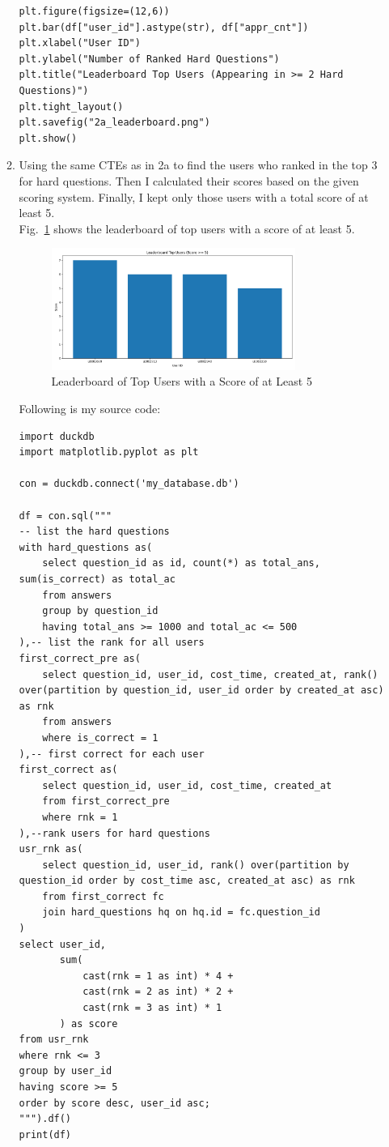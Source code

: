 \documentclass[12pt,a4paper]{article}
\begin{document}
\begin{enumerate}
\begin{enumerate}
\begin{verbatim}
plt.figure(figsize=(12,6))
plt.bar(df["user_id"].astype(str), df["appr_cnt"])
plt.xlabel("User ID")
plt.ylabel("Number of Ranked Hard Questions")
plt.title("Leaderboard Top Users (Appearing in >= 2 Hard Questions)")
plt.tight_layout()
plt.savefig("2a_leaderboard.png")
plt.show()            
        \end{verbatim}
        \item Using the same CTEs as in 2a to find the users who ranked in the top 3 for hard questions. Then I calculated their scores based on the given scoring system. Finally, I kept only those users with a total score of at least 5.\\
        Fig.~\ref{fig:2b} shows the leaderboard of top users with a score of at least 5.
        \begin{figure}[H]
            \centering
            \includegraphics[width=0.8\textwidth]{code/2b_leaderboard.png}
            \caption{Leaderboard of Top Users with a Score of at Least 5}
            \label{fig:2b}
        \end{figure}
        Following is my source code:
        \begin{verbatim}
import duckdb
import matplotlib.pyplot as plt

con = duckdb.connect('my_database.db')

df = con.sql("""
-- list the hard questions
with hard_questions as(
    select question_id as id, count(*) as total_ans, sum(is_correct) as total_ac
    from answers
    group by question_id
    having total_ans >= 1000 and total_ac <= 500
),-- list the rank for all users
first_correct_pre as(
    select question_id, user_id, cost_time, created_at, rank() over(partition by question_id, user_id order by created_at asc) as rnk
    from answers
    where is_correct = 1
),-- first correct for each user
first_correct as(
    select question_id, user_id, cost_time, created_at
    from first_correct_pre
    where rnk = 1
),--rank users for hard questions
usr_rnk as(
    select question_id, user_id, rank() over(partition by question_id order by cost_time asc, created_at asc) as rnk
    from first_correct fc
    join hard_questions hq on hq.id = fc.question_id
)
select user_id, 
       sum(
           cast(rnk = 1 as int) * 4 +
           cast(rnk = 2 as int) * 2 +
           cast(rnk = 3 as int) * 1
       ) as score
from usr_rnk
where rnk <= 3
group by user_id
having score >= 5
order by score desc, user_id asc;
""").df()
print(df)


\end{verbatim}
\end{enumerate}
\end{enumerate}
\end{document}
